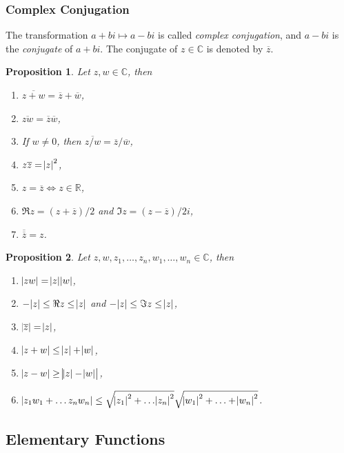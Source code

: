 \documentclass[12pt]{article}
\newcommand{\CC}{\mathbb{C}}
\newcommand{\RR}{\mathbb{R}}
\newtheorem{prop}{Proposition}[theorem]
\theoremstyle{definition}
\begin{document}
\subsubsection{Complex Conjugation}
The transformation $a+bi \mapsto a-bi$ is called \emph{complex conjugation}, and $a-bi$ is the \emph{conjugate} of $a+bi$. The conjugate of $z \in \CC$ is denoted by $\overline z$.
\begin{prop}
Let $z,w \in \CC$, then
\begin{enumerate}
	\item
		$\overline{z + w} = \overline z + \overline w$,
	\item
		$\overline{zw} = \overline z \overline w$,
	\item
		If $w \neq 0$, then $\overline{z/w} = \overline z / \overline w$, 
	\item
		$z \overline z = \abs{z}^2$,
	\item
		$z = \overline z \Leftrightarrow z \in \RR$,
	\item
		$\Re z = (z + \overline z)/2$ and $\Im z = (z - \overline z)/2i$,
	\item
		$\overline{\overline z} = z$.
\end{enumerate}
\end{prop}
\begin{prop}
Let $z, w, z_1, \ldots, z_n, w_1, \ldots, w_n \in \CC$, then
\begin{enumerate}
	\item
		$\abs{zw} = \abs z \abs w$,
	\item
		$-\abs z \leq \Re z \leq \abs z$ and $-\abs z \leq \Im z \leq \abs z$,
	\item
		$\abs{ \overline z } = \abs z$,
	\item
		$\abs{z+w} \leq \abs z + \abs w$,
	\item
		$\abs{z-w} \geq \abs{ \abs z - \abs w}$,
	\item
		$\abs{z_1w_1 + \ldots z_n w_n} \leq \sqrt{\abs{z_1}^2 + \ldots \abs{z_n}^2} \sqrt{\abs{w_1}^2 + \ldots + \abs{w_n}^2} $.
\end{enumerate}
\end{prop}
\subsection{Elementary Functions}
\end{document}
